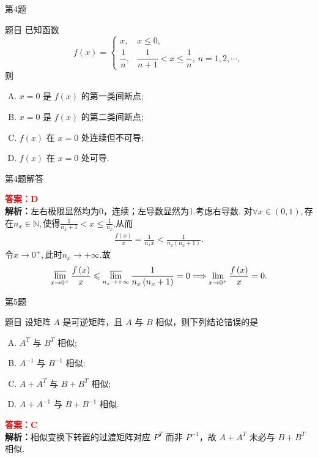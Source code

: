 \documentclass[aspectratio=169]{beamer}
\begin{document}
\begin{frame}{第4题}
\begin{block}{题目}
已知函数
\[f(x)=\begin{cases} x, & x \leqslant 0, \\[4pt]
\dfrac{1}{n}, & \dfrac{1}{n+1}<x \leqslant \dfrac{1}{n},\ n=1,2,\cdots,\end{cases}\]
则
\begin{enumerate}[A.]
\item \(x=0\) 是 \(f(x)\) 的第一类间断点;
\item \(x=0\) 是 \(f(x)\) 的第二类间断点;
\item \(f(x)\) 在 \(x=0\) 处连续但不可导;
\item \(f(x)\) 在 \(x=0\) 处可导.
\end{enumerate}
\end{block}
\end{frame}

\begin{frame}{第4题解答}
\begin{block}{}
\textcolor{red}{\textbf{答案：}$\mathbf{D}$} \\
\textbf{解析：}左右极限显然均为0，连续；左导数显然为1.考虑右导数.
对$\forall x\in \left( 0,1 \right) ,$存在$n_x\in \mathbb{N} ,$使得$\frac{1}{n_x+1}<x\leqslant \frac{1}{n_x}.$从而
\begin{align*}
\frac{f\left( x \right)}{x}=\frac{1}{n_xx}<\frac{1}{n_x\left( n_x+1 \right)}.
\end{align*}
令$x\rightarrow 0^+,$此时$n_x\rightarrow +\infty .$故
\begin{align*}
\varlimsup\limits_{x\rightarrow 0^+}\frac{f\left( x \right)}{x}\leqslant \varlimsup\limits_{n_x\rightarrow +\infty}\frac{1}{n_x\left( n_x+1 \right)}=0\Longrightarrow \lim\limits_{x\rightarrow 0^+}\frac{f\left( x \right)}{x}=0.
\end{align*}
\end{block}
\end{frame}

\begin{frame}{第5题}
\begin{block}{题目}
设矩阵 \(A\) 是可逆矩阵，且 \(A\) 与 \(B\) 相似，则下列结论错误的是
\begin{enumerate}[A.]
\item \(A^{T}\) 与 \(B^{T}\) 相似;
\item \(A^{-1}\) 与 \(B^{-1}\) 相似;
\item \(A+A^{T}\) 与 \(B+B^{T}\) 相似;
\item \(A+A^{-1}\) 与 \(B+B^{-1}\) 相似.
\end{enumerate}
\textcolor{red}{\textbf{答案：}$\mathbf{C}$} \\
\textbf{解析：}相似变换下转置的过渡矩阵对应 $P^T$ 而非 $P^{-1}$，故 $A+A^T$ 未必与 $B+B^T$ 相似.
\end{block}
\end{frame}
\end{document}
